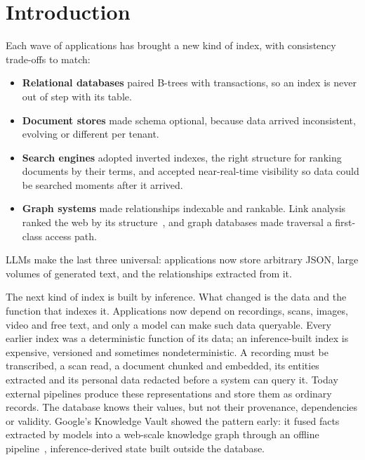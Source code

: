 \documentclass[sigconf,nonacm]{acmart}
\begin{document}
\section{Introduction}

Each wave of applications has brought a new kind of index, with consistency
trade-offs to match:

\begin{itemize}
  \item \textbf{Relational databases} paired B-trees with transactions, so an
    index is never out of step with its table.
  \item \textbf{Document stores} made schema optional, because data arrived
    inconsistent, evolving or different per tenant.
  \item \textbf{Search engines} adopted inverted indexes, the right structure
    for ranking documents by their terms, and accepted near-real-time
    visibility so data could be searched moments after it arrived.
  \item \textbf{Graph systems} made relationships indexable and rankable. Link
    analysis ranked the web by its structure~\cite{brin1998anatomy}, and graph
    databases made traversal a first-class access path.
\end{itemize}

LLMs make the last three universal: applications now store arbitrary JSON,
large volumes of generated text, and the relationships extracted from it.

The next kind of index is built by inference. What changed is the data and
the function that indexes it. Applications now depend on recordings, scans,
images, video and free text, and only a model can make such data queryable.
Every earlier index was a deterministic function of its data; an
inference-built index is expensive, versioned and sometimes nondeterministic.
A recording must be transcribed, a scan read, a document chunked and
embedded, its entities extracted and its personal data redacted before a
system can query it. Today external pipelines produce these representations
and store them as ordinary records. The database knows their values, but not
their provenance, dependencies or validity. Google's Knowledge Vault showed
the pattern early: it fused facts extracted by models into a web-scale
knowledge graph through an offline pipeline~\cite{dong2014knowledgevault},
inference-derived state built outside the database.
\end{document}
